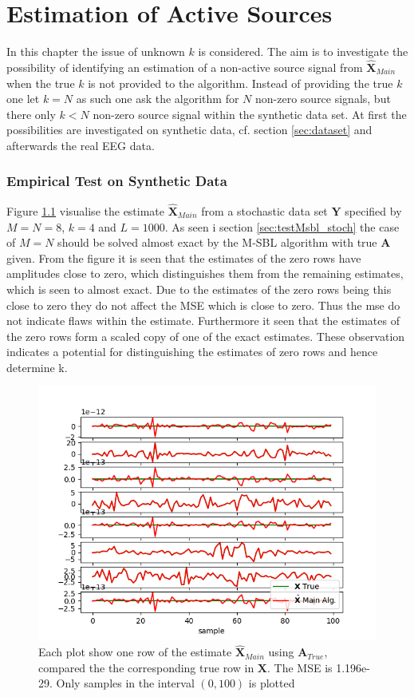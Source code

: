 \chapter{Estimation of Active Sources}
In this chapter the issue of unknown $k$ is considered. The aim is to investigate the possibility of identifying an estimation of a non-active source signal from $\hat{\textbf{X}}_{Main}$ when the true $k$ is not provided to the algorithm. Instead of providing the true $k$ one let $k=N$ as such one ask the algorithm for $N$ non-zero source signals, but there only $k<N$ non-zero source signal within the synthetic data set. 
At first the possibilities are investigated on synthetic data, cf. section \ref{sec:dataset} and afterwards the real EEG data.   

\subsection{Empirical Test on Synthetic Data}
Figure \ref{fig:ktest1} visualise the estimate $\hat{\textbf{X}}_{Main}$ from a stochastic data set $\textbf{Y}$ specified by $M=N=8$, $k=4$ and $L=1000$. 
As seen i section \ref{sec:testMsbl_stoch} the case of $M=N$ should be solved almost exact by the M-SBL algorithm with true $\textbf{A}$ given. From the figure it is seen that the estimates of the zero rows have amplitudes close to zero, which distinguishes them from the remaining estimates, which is seen to almost exact. Due to the estimates of the zero rows being this close to zero they do not affect the MSE which is close to zero. Thus the mse do not indicate flaws within the estimate. 
Furthermore it seen that the estimates of the zero rows form a scaled copy of one of the exact estimates. These observation indicates a potential for distinguishing the estimates of zero rows and hence determine k.     
\begin{figure}[H]
    \centering
	\includegraphics[scale=0.5]{figures/ch_estimate/k_test1.png}
	\caption{Each plot show one row of the estimate $\hat{\textbf{X}}_{Main}$ using $\textbf{A}_{True}$, compared the the corresponding true row in $\textbf{X}$. The MSE is 1.196e-29. Only samples in the interval $(0,100)$ is plotted}
	\label{fig:ktest1}
\end{figure}
